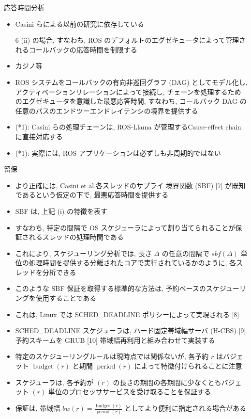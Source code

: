 \begin{frame}{応答時間分析}
    \begin{itemize}
        \item Casini らによる以前の研究に依存している
\item [6] (ii) の場合, すなわち, ROS のデフォルトのエグゼキュータによって管理されるコールバックの応答時間を制限する
\item カジノ等
\item ROS システムをコールバックの有向非巡回グラフ (DAG) としてモデル化し, アクティベーションリレーションによって接続し, チェーンを処理するためのエグゼキュータを意識した最悪応答時間, すなわち, コールバック DAG の任意のパスのエンドツーエンドレイテンシの境界を提供する
\item (*1): Casini らの処理チェーンは, ROS-Llama が管理するCause-effect chainに直接対応する
\item (*1): 実際には, ROS アプリケーションは必ずしも非周期的ではない
    \end{itemize}
\end{frame}

\begin{frame}{留保}
    \begin{itemize}
        \item より正確には, Casini et al.各スレッドのサプライ 境界関数 (SBF) [7] が既知であるという仮定の下で, 最悪応答時間を提供する
\item SBF は, 上記 (i) の特徴を表す
\item すなわち, 特定の間隔で OS スケジューラによって割り当てられることが保証されるスレッドの処理時間である
\item これにより, スケジューリング分析では, 長さ $\Delta$ の任意の間隔で $s b f(\Delta)$ 単位の処理時間を提供する分離されたコアで実行されているかのように, 各スレッドを分析できる
\item このような SBF 保証を取得する標準的な方法は, 予約ベースのスケジューリングを使用することである
\item これは, Linux では SCHED\_DEADLINE ポリシーによって実現される [8]
    \end{itemize}
\end{frame}

\begin{frame}{}
    \begin{itemize}
        \item SCHED\_DEADLINE スケジューラは, ハード固定帯域幅サーバ (H-CBS) [9] 予約スキームを GRUB [10] 帯域幅再利用と組み合わせて実装する
\item 特定のスケジューリングルールは現時点では関係ないが, 各予約 $r$ はバジェット $\operatorname{budget}(r)$ と期間 $\operatorname{period}(r)$ によって特徴付けられることに注意
\item スケジューラは, 各予約が $(r)$ の長さの期間の各期間に少なくともバジェット $(r)$ 単位のプロセッササービスを受け取ることを保証する
\item 保証は, 帯域幅 $b w(r)=\frac{\operatorname{budget}(r)}{\text { period }(r)}$ としてより便利に指定される場合がある
    \end{itemize}
\end{frame}

